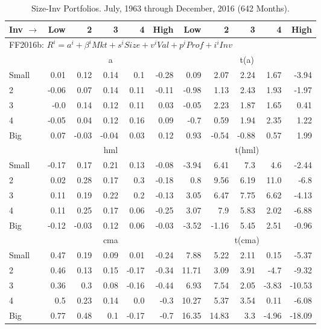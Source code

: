 
\begin{table}[!ht]
\centering
\caption{Size-Inv Portfolios. \footnotesize{July, 1963 through December, 2016 (642 Months).}}
\label{tbl:25_Size_Inv}
\begin{tabular}{lrrrrrrrrrr}
  \toprule
  Inv $\rightarrow$ & Low & 2 & 3 & 4 & High & Low & 2 & 3 & 4 & High \\ 
  \toprule
  \multicolumn{9}{l}{FF2016b: $R^i=a^i+\beta^iMkt+s^iSize+v^iVal+p^iProf+i^iInv$} \\

      & \multicolumn{5}{c}{a} & \multicolumn{5}{c}{t(a)} \\
    \cmidrule(r){2-6} \cmidrule(r){7-11}
      Small  & 0.01  & 0.12  & 0.14  & 0.1  & -0.28   & 0.09  & 2.07  & 2.24  & 1.67  & -3.94  \\
          2  & -0.06  & 0.07  & 0.14  & 0.11  & -0.11   & -0.98  & 1.13  & 2.43  & 1.93  & -1.97  \\
          3  & -0.0  & 0.14  & 0.12  & 0.11  & 0.03   & -0.05  & 2.23  & 1.87  & 1.65  & 0.41  \\
          4  & -0.05  & 0.04  & 0.12  & 0.16  & 0.09   & -0.7  & 0.59  & 1.94  & 2.35  & 1.22  \\
      Big    & 0.07  & -0.03  & -0.04  & 0.03  & 0.12   & 0.93  & -0.54  & -0.88  & 0.57  & 1.99  \\

      & \multicolumn{5}{c}{hml} & \multicolumn{5}{c}{t(hml)} \\
    \cmidrule(r){2-6} \cmidrule(r){7-11}
      Small  & -0.17  & 0.17  & 0.21  & 0.13  & -0.08   & -3.94  & 6.41  & 7.3  & 4.6  & -2.44  \\
          2  & 0.02  & 0.28  & 0.17  & 0.3  & -0.18   & 0.8  & 9.56  & 6.19  & 11.0  & -6.8  \\
          3  & 0.11  & 0.19  & 0.22  & 0.2  & -0.13   & 3.05  & 6.47  & 7.75  & 6.62  & -4.13  \\
          4  & 0.11  & 0.25  & 0.17  & 0.06  & -0.25   & 3.07  & 7.9  & 5.83  & 2.02  & -6.88  \\
      Big    & -0.12  & -0.03  & 0.12  & 0.06  & -0.03   & -3.52  & -1.16  & 5.45  & 2.51  & -0.96  \\

      & \multicolumn{5}{c}{cma} & \multicolumn{5}{c}{t(cma)} \\
    \cmidrule(r){2-6} \cmidrule(r){7-11}
      Small  & 0.47  & 0.19  & 0.09  & 0.01  & -0.24   & 7.88  & 5.22  & 2.11  & 0.15  & -5.37  \\
          2  & 0.46  & 0.13  & 0.15  & -0.17  & -0.34   & 11.71  & 3.09  & 3.91  & -4.7  & -9.32  \\
          3  & 0.36  & 0.3  & 0.08  & -0.16  & -0.44   & 6.93  & 7.54  & 2.05  & -3.83  & -10.53  \\
          4  & 0.5  & 0.23  & 0.14  & 0.0  & -0.3   & 10.27  & 5.37  & 3.54  & 0.11  & -6.08  \\
      Big    & 0.77  & 0.48  & 0.1  & -0.17  & -0.7   & 16.35  & 14.83  & 3.3  & -4.96  & -18.09  \\


\end{tabular}
\end{table}

